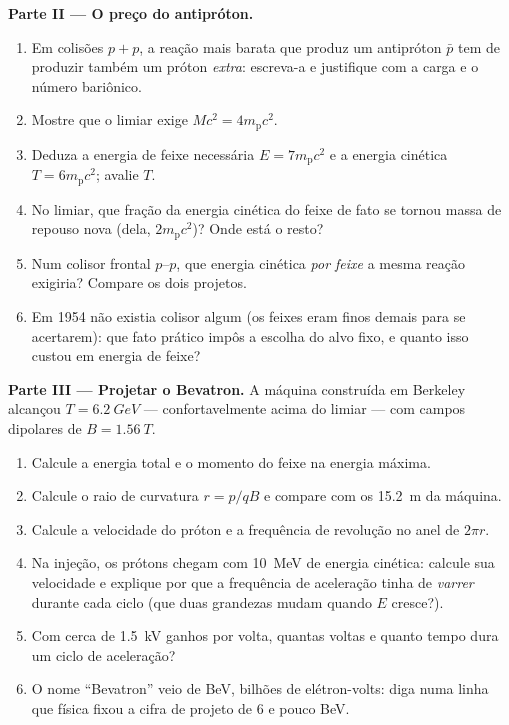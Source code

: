 \begin{problem}
\medskip\noindent\textbf{Parte II --- O preço do antipróton.}
\begin{enumerate}[resume]
  \item Em colisões $p + p$, a reação mais barata que produz um
        antipróton $\bar p$ tem de produzir também um próton
        \emph{extra}: escreva-a e justifique com a carga e o número
        bariônico.
  \item Mostre que o limiar exige $Mc^2 = 4m_{\text{p}}c^2$.
  \item Deduza a energia de feixe necessária $E = 7m_{\text{p}}c^2$ e
        a energia cinética $T = 6m_{\text{p}}c^2$; avalie $T$.
  \item No limiar, que fração da energia cinética do feixe de fato se
        tornou massa de repouso nova (dela, $2m_{\text{p}}c^2$)? Onde
        está o resto?
  \item Num colisor frontal $p$--$p$, que energia cinética \emph{por
        feixe} a mesma reação exigiria? Compare os dois projetos.
  \item Em 1954 não existia colisor algum (os feixes eram finos
        demais para se acertarem): que fato prático impôs a escolha do
        alvo fixo, e quanto isso custou em energia de feixe?
\end{enumerate}

\medskip\noindent\textbf{Parte III --- Projetar o Bevatron.}
A máquina construída em Berkeley alcançou $T = \qty{6.2}{GeV}$ ---
confortavelmente acima do limiar --- com campos dipolares de $B =
\qty{1.56}{T}$.
\begin{enumerate}[resume]
  \item Calcule a energia total e o momento do feixe na energia
        máxima.
  \item Calcule o raio de curvatura $r = p/qB$ e compare com os
        \qty{15.2}{m} da máquina.
  \item Calcule a velocidade do próton e a frequência de revolução no
        anel de $2\pi r$.
  \item Na injeção, os prótons chegam com \qty{10}{MeV} de energia
        cinética: calcule sua velocidade e explique por que a
        frequência de aceleração tinha de \emph{varrer} durante cada
        ciclo (que duas grandezas mudam quando $E$ cresce?).
  \item Com cerca de \qty{1.5}{kV} ganhos por volta, quantas voltas e
        quanto tempo dura um ciclo de aceleração?
  \item O nome ``Bevatron'' veio de BeV, bilhões de elétron-volts:
        diga numa linha que física fixou a cifra de projeto de $6$ e
        pouco BeV.
\end{enumerate}


\end{problem}
